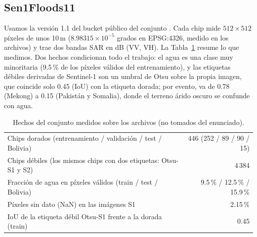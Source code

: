 \documentclass{article}
\begin{document}
\subsection{Sen1Floods11}
Usamos la versión 1.1 del bucket público del conjunto \cite{bonafilia2020}. Cada chip mide $512\times512$ píxeles de unos 10\,m ($8.98315\times10^{-5}$ grados en EPSG:4326, medido en los archivos) y trae dos bandas SAR en dB (VV, VH). La Tabla~\ref{tab:datos} resume lo que medimos. Dos hechos condicionan todo el trabajo: el agua es una clase muy minoritaria (9.5\,\% de los píxeles válidos del entrenamiento), y las etiquetas débiles derivadas de Sentinel-1 son un umbral de Otsu sobre la propia imagen, que coincide solo 0.45 (IoU) con la etiqueta dorada; por evento, va de 0.78 (Mekong) a 0.15 (Pakistán y Somalia), donde el terreno árido oscuro se confunde con agua.

\begin{table}[H]
\centering
\caption{Hechos del conjunto medidos sobre los archivos (no tomados del enunciado).}
\label{tab:datos}
\small
\begin{tabular}{lr}
\toprule
Chips dorados (entrenamiento / validación / test / Bolivia) & 446 (252 / 89 / 90 / 15) \\
Chips débiles (los mismos chips con dos etiquetas: Otsu-S1 y S2) & 4\,384 \\
Fracción de agua en píxeles válidos (train / test / Bolivia) & 9.5\,\% / 12.5\,\% / 15.9\,\% \\
Píxeles sin dato (NaN) en las imágenes S1 & 2.15\,\% \\
IoU de la etiqueta débil Otsu-S1 frente a la dorada (train) & 0.45 \\
\bottomrule
\end{tabular}
\end{table}
\end{document}
